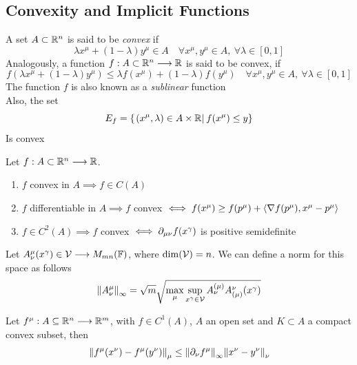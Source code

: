 \documentclass[../complete.tex]{subfiles}
\begin{document}
\subsection{Convexity and Implicit Functions}
\begin{dfn}
	A set $A\subset\mathbb{R}^n$ is said to be \textit{convex} if
	\begin{equation}
		\lambda x^\mu+(1-\lambda)y^\mu\in A\quad\forall x^\mu,y^\mu\in A,\ \forall\lambda\in[0,1]
		\label{eq:convexityset}
	\end{equation}
	Analogously, a function $f:A\subset\mathbb{R}^n\overset{}{\longrightarrow}\mathbb{R}$ is said to be convex, if
	\begin{equation}
		f\left( \lambda x^\mu+(1-\lambda)y^\mu \right)\le\lambda f(x^\mu)+(1-\lambda)f(y^\mu)\quad\forall x^\mu,y^\mu\in A,\ \forall\lambda\in[0,1]
		\label{eq:convexfx}
	\end{equation}
	The function $f$ is also known as a \textit{sublinear} function\\
	Also, the set
	\begin{equation}
		E_f=\{\left.(x^\mu,\lambda)\in A\times\mathbb{R}\right|_{}f(x^\mu)\le y\}
		\label{eq:convexset}
	\end{equation}
	Is convex
\end{dfn}
\begin{thm}[Convexity]
	Let $f:A\subset\mathbb{R}^n\overset{}{\longrightarrow}\mathbb{R}$.
	\begin{enumerate}
	\item $f$ convex in $A\implies{} f\in C(A)$
	\item $f$ differentiable in $A\implies{} f$ convex $\iff f(x^\mu)\ge f(p^\mu)+\langle \nabla f(p^\mu), x^\mu-p^\mu \rangle$
	\item $f\in C^2(A)\implies{} f$ convex $\iff \partial_{\mu\nu}f(x^\gamma)$ is positive semidefinite
	\end{enumerate}
\end{thm}
\begin{dfn}
	Let $A^\mu_\nu(x^\gamma)\in\mathcal{V}\overset{}{\longrightarrow} M_{mn}(\mathbb{F})$, where $\dim(\mathcal{V})=n$. We can define a norm for this space as follows
	\begin{equation}
		\norm{A^\mu_\nu}_\infty=\sqrt{m}\sqrt{\max_{\mu}\sup_{x^\gamma\in\mathcal{V}}A^{(\mu)}_\nu A^\nu_{(\mu)}(x^\gamma)}
		\label{eq:matrixinorm}
	\end{equation}
\end{dfn}
\begin{thm}
	Let $f^\mu:A\subseteq\mathbb{R}^n\overset{}{\longrightarrow}\mathbb{R}^m$, with $f\in C^1(A)$, $A$ an open set and $K\subset A$ a compact convex subset, then
	\begin{equation}
		\norm{f^\mu(x^\nu)-f^\mu(y^\nu)}_\mu\le\norm{\partial_\nu f^\mu}_\infty\norm{x^\nu-y^\nu}_\nu
		\label{eq:averageval}
	\end{equation}
\end{thm}
\end{document}
